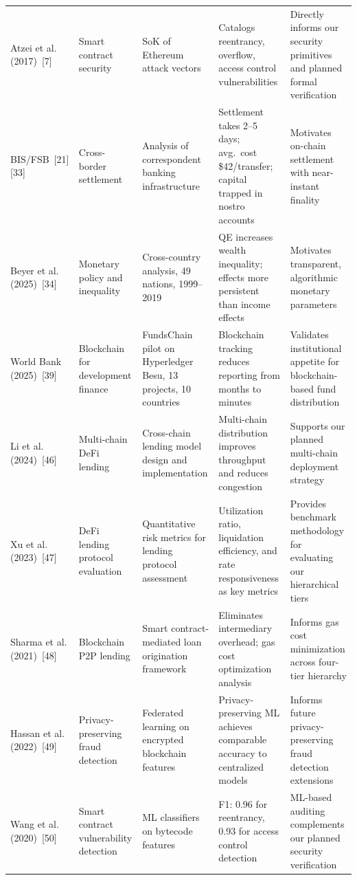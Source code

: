 \documentclass[12pt,a4paper]{report}
\begin{document}
\begin{longtable}{@{} p{2.2cm} p{2.2cm} p{2.5cm} p{2.8cm} p{2.8cm} @{}}
\rowcolor{RowShade}
Atzei et al. (2017)~[7] & Smart contract security & SoK of Ethereum attack vectors & Catalogs reentrancy, overflow, access control vulnerabilities & Directly informs our security primitives and planned formal verification \\
BIS/FSB~[21][33] & Cross-border settlement & Analysis of correspondent banking infrastructure & Settlement takes 2--5 days; avg.\ cost \$42/transfer; capital trapped in nostro accounts & Motivates on-chain settlement with near-instant finality \\
\rowcolor{RowShade}
Beyer et al. (2025)~[34] & Monetary policy and inequality & Cross-country analysis, 49 nations, 1999--2019 & QE increases wealth inequality; effects more persistent than income effects & Motivates transparent, algorithmic monetary parameters \\
World Bank (2025)~[39] & Blockchain for development finance & FundsChain pilot on Hyperledger Besu, 13 projects, 10 countries & Blockchain tracking reduces reporting from months to minutes & Validates institutional appetite for blockchain-based fund distribution \\
\rowcolor{RowShade}
Li et al. (2024)~[46] & Multi-chain DeFi lending & Cross-chain lending model design and implementation & Multi-chain distribution improves throughput and reduces congestion & Supports our planned multi-chain deployment strategy \\
Xu et al. (2023)~[47] & DeFi lending protocol evaluation & Quantitative risk metrics for lending protocol assessment & Utilization ratio, liquidation efficiency, and rate responsiveness as key metrics & Provides benchmark methodology for evaluating our hierarchical tiers \\
\rowcolor{RowShade}
Sharma et al. (2021)~[48] & Blockchain P2P lending & Smart contract-mediated loan origination framework & Eliminates intermediary overhead; gas cost optimization analysis & Informs gas cost minimization across four-tier hierarchy \\
Hassan et al. (2022)~[49] & Privacy-preserving fraud detection & Federated learning on encrypted blockchain features & Privacy-preserving ML achieves comparable accuracy to centralized models & Informs future privacy-preserving fraud detection extensions \\
\rowcolor{RowShade}
Wang et al. (2020)~[50] & Smart contract vulnerability detection & ML classifiers on bytecode features & F1: 0.96 for reentrancy, 0.93 for access control detection & ML-based auditing complements our planned security verification \\

\end{longtable}
\end{document}
